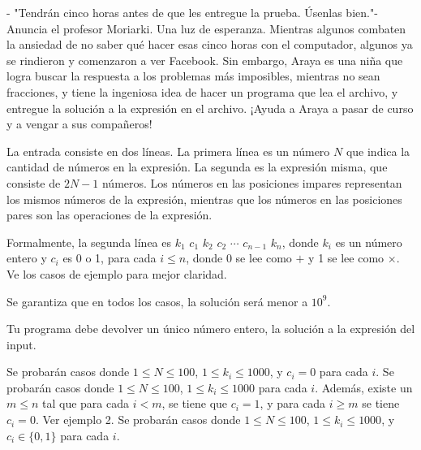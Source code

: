 \documentclass{oci}
\begin{document}
\begin{problemDescription}
- "Tendrán cinco horas antes de que les entregue la prueba. Úsenlas bien."- Anuncia el profesor Moriarki. Una luz de esperanza. Mientras algunos combaten la ansiedad de no saber qué hacer esas cinco horas con el computador, algunos ya se rindieron y comenzaron a ver Facebook. Sin embargo, Araya es una niña que logra buscar la respuesta a los problemas más imposibles, mientras no sean fracciones, y tiene la ingeniosa idea de hacer un programa que lea el archivo, y entregue la solución a la expresión en el archivo. ¡Ayuda a Araya a pasar de curso y a vengar a sus compañeros!

\end{problemDescription}

\begin{inputDescription}
La entrada consiste en dos líneas. La primera línea es un número $N$ que indica la cantidad de números en la expresión. La segunda es la expresión misma, que consiste de $2N-1$ números. Los números en las posiciones impares representan los mismos números de la expresión, mientras que los números en las posiciones pares son las operaciones de la expresión. 

Formalmente, la segunda línea es $k_1$ $c_1$ $k_2$ $c_2$ $\cdots$ $c_{n-1}$ $k_n$, donde $k_i$ es un número entero y $c_i$ es 0 o 1, para cada $i \leq n$, donde 0 se lee como $+$ y 1 se lee como $\times$. Ve los casos de ejemplo para mejor claridad.

Se garantiza que en todos los casos, la solución será menor a $10^9$.
\end{inputDescription}

\begin{outputDescription}
Tu programa debe devolver un único número entero, la solución a la expresión del input.
\end{outputDescription}

\begin{scoreDescription}
   Se probarán casos donde $1 \leq N \leq 100$, $1\leq k_i \leq 1000$, y $c_i = 0$ para cada $i$.
   Se probarán casos donde $1 \leq N \leq 100$, $1\leq k_i \leq 1000$ para cada $i$. Además, existe un $m \leq n$ tal que para cada $i < m$, se tiene que $c_i = 1$, y para cada $i \geq m$ se tiene $c_i = 0$. Ver ejemplo 2.
   Se probarán casos donde $1 \leq N \leq 100$, $1\leq k_i \leq 1000$, y $c_i \in \{0,1\}$ para cada $i$.
\end{scoreDescription}

\begin{sampleDescription}
\end{sampleDescription}
\end{document}
